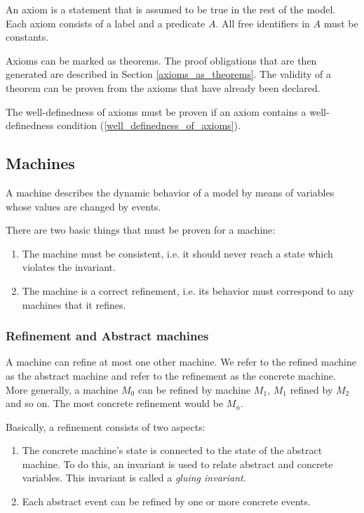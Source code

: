 An axiom is a statement that is assumed to be true in the rest of the model.
Each axiom consists of a label and a predicate $A$.
All free identifiers in $A$ must be constants.

Axioms can be marked as theorems. The proof obligations that are then generated are described in Section \ref{axioms_as_theorems}.
The validity of a theorem can be proven from the axioms that have already been declared.

The well-definedness of axioms must be proven if an axiom contains a well-definedness condition (\ref{well_definedness_of_axioms}).

\subsection{Machines}
\label{machine}

A machine describes the dynamic behavior of a model by means of variables whose values are changed by events.

There are two basic things that must be proven for a machine:
\begin{enumerate}
	\item The machine must be consistent, i.e. it should never reach a state which violates the invariant.
	\item The machine is a correct refinement, i.e. its behavior must correspond to any machines that it refines.
\end{enumerate}

\subsubsection{Refinement and Abstract machines}
\label{abstract_machine}

A machine can refine at most one other machine. 
We refer to the refined machine as the abstract machine and refer to the refinement as the concrete machine. 
More generally, a machine $M_0$ can be refined by machine $M_1$, $M_1$ refined by $M_2$ 
and so on. The most concrete refinement would be $M_n$. 

Basically, a refinement consists of two aspects:
\begin{enumerate}
	\item The concrete machine's state is connected to the state of the
      abstract machine. To do this, an invariant is used to relate abstract and concrete variables. 
      This invariant is called a \emph{gluing invariant}. 
	\item Each abstract event can be refined by one or more
concrete events.
\end{enumerate}

